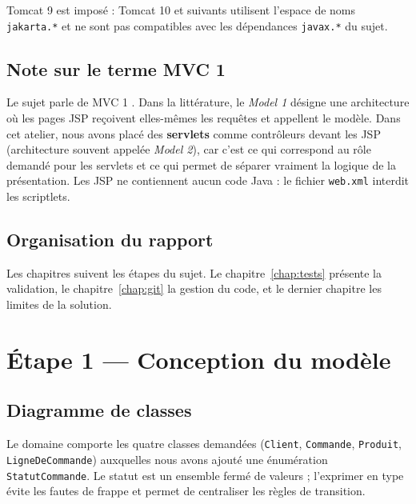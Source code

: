 \documentclass[11pt,a4paper]{report}
\begin{document}
Tomcat 9 est impos\'e : Tomcat 10 et suivants utilisent l'espace de noms \texttt{jakarta.*} et ne sont pas compatibles avec les d\'ependances \texttt{javax.*} du sujet.

\section{Note sur le terme \og MVC 1 \fg{}}
Le sujet parle de \og MVC 1 \fg{}. Dans la litt\'erature, le \emph{Model 1} d\'esigne une architecture o\`u les pages JSP re\c coivent elles-m\^emes les requ\^etes et appellent le mod\`ele. Dans cet atelier, nous avons plac\'e des \textbf{servlets} comme contr\^oleurs devant les JSP (architecture souvent appel\'ee \emph{Model 2}), car c'est ce qui correspond au r\^ole demand\'e pour les servlets et ce qui permet de s\'eparer vraiment la logique de la pr\'esentation. Les JSP ne contiennent aucun code Java : le fichier \texttt{web.xml} interdit les scriptlets.

\section{Organisation du rapport}
Les chapitres suivent les \'etapes du sujet. Le chapitre~\ref{chap:tests} pr\'esente la validation, le chapitre~\ref{chap:git} la gestion du code, et le dernier chapitre les limites de la solution.

\chapter{\'Etape 1 --- Conception du mod\`ele}
\section{Diagramme de classes}
Le domaine comporte les quatre classes demand\'ees (\texttt{Client}, \texttt{Commande}, \texttt{Produit}, \texttt{LigneDeCommande}) auxquelles nous avons ajout\'e une \'enum\'eration \texttt{StatutCommande}. Le statut est un ensemble ferm\'e de valeurs ; l'exprimer en type \'evite les fautes de frappe et permet de centraliser les r\`egles de transition.
\end{document}
